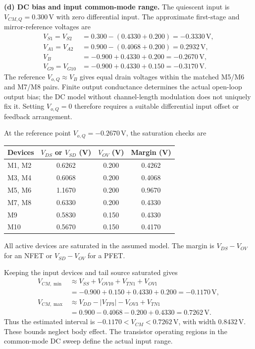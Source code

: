 \documentclass[12pt,letterpaper]{article}
\newcommand{\V}{\,\mathrm{V}}
\begin{document}
\begin{enumerate}
\newpage
\textbf{(d) DC bias and input common-mode range.}
The quiescent input is $V_{CM,Q}=0.300\V$ with zero differential input.
The approximate first-stage and mirror-reference voltages are
\begin{align*}
V_{S1}=V_{S2}&=0.300-(0.4330+0.200)=-0.3330\V,\\
V_{A1}=V_{A2}&=0.900-(0.4068+0.200)=0.2932\V,\\
V_B&=-0.900+0.4330+0.200=-0.2670\V,\\
V_{G9}=V_{G10}&=-0.900+0.4330+0.150=-0.3170\V.
\end{align*}
The reference $V_{o,Q}\approx V_B$ gives equal drain voltages
within the matched M5/M6 and M7/M8 pairs. Finite output
conductance determines the actual open-loop output bias; the DC
model without channel-length modulation does not uniquely fix it.
Setting $V_{o,Q}=0$ therefore requires a suitable differential
input offset or feedback arrangement.

At the reference point $V_{o,Q}=-0.2670\V$, the saturation checks are
\begin{center}
\small
\begin{tabular}{@{}lccc@{}}
\toprule
Devices & $V_{DS}$ or $V_{SD}$ (V) & $V_{OV}$ (V) & Margin (V)\\
\midrule
M1, M2 & 0.6262 & 0.200 & 0.4262\\
M3, M4 & 0.6068 & 0.200 & 0.4068\\
M5, M6 & 1.1670 & 0.200 & 0.9670\\
M7, M8 & 0.6330 & 0.200 & 0.4330\\
M9 & 0.5830 & 0.150 & 0.4330\\
M10 & 0.5670 & 0.150 & 0.4170\\
\bottomrule
\end{tabular}
\end{center}
All active devices are saturated in the assumed model.
The margin is $V_{DS}-V_{OV}$ for an NFET or $V_{SD}-V_{OV}$
for a PFET.

Keeping the input devices and tail source saturated gives
\begin{align*}
V_{CM,\min}&\approx V_{SS}+V_{OV10}+V_{TN1}+V_{OV1}\\
&=-0.900+0.150+0.4330+0.200=-0.1170\V,\\
V_{CM,\max}&\approx V_{DD}-|V_{TP3}|-V_{OV3}+V_{TN1}\\
&=0.900-0.4068-0.200+0.4330=0.7262\V.
\end{align*}
Thus the estimated interval is $-0.1170<V_{CM}<0.7262\V$,
with width $0.8432\V$. These bounds neglect body effect.
The transistor operating regions in the common-mode DC sweep
define the actual input range.


\end{enumerate}
\end{document}
